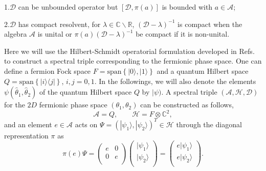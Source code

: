 \documentclass[a4paper,12pt]{article}
\begin{document}
1.\;$\mathcal{D}$ can be unbounded operator but $[\mathcal{D},\pi(a)]$ is bounded with $a\in\mathcal{A}$;

2.\;$\mathcal{D}$ has compact resolvent, for $\lambda\in\mathds{C}\backslash\mathds{R}$, $(\mathcal{D}-\lambda)^{-1}$  is compact when the algebra $\mathcal{A}$ is unital or $\pi(a)(\mathcal{D}-\lambda)^{-1}$ be compact if it is non-unital.


Here we will use the Hilbert-Schmidt operatorial formulation developed in Refs.~\cite{Revisiting,Formulation} to construct a spectral triple corresponding to the fermionic phase space. One can define a fermion Fock space $F=\mathrm{span}\left\{|0\rangle,|1\rangle\right\}$ and a quantum Hilbert space $Q=\mathrm{span}\left\{|i\rangle\langle j|\right\}$,
$i,j=0,1$.
In the followings, we will also denote the elements $\psi(\hat{\theta}_1,\hat{\theta}_2)$ of the quantum Hilbert space $Q$ by $|\psi)$.
A spectral triple $(\mathcal{A},\mathcal{H},\mathcal{D})$ for the $2D$ fermionic phase space $(\theta_1, \theta_2)$ can be constructed as follows,
\begin{equation}
	\mathcal{A}=Q,
	\qquad\mathcal{H}=F\otimes \mathds{C}^2,
\end{equation}
and an element $e\in \mathcal{A}$ acts on
$\Psi=\left(|\psi_1\rangle, |\psi_2\rangle\right)^T\in\mathcal{H}$
through the diagonal representation $\pi$ as
\begin{equation}
	\pi(e)\Psi
	=\left(\begin{array}{cc}
		e & 0\\
		0 & e\\
	\end{array}\right)\left(\begin{array}{c}
		|\psi_1\rangle \\
		|\psi_2\rangle \\
	\end{array}\right)
	=\left(\begin{array}{c}
		e|\psi_1\rangle \\
		e|\psi_2\rangle \\
	\end{array}\right).
\end{equation}
\end{document}
